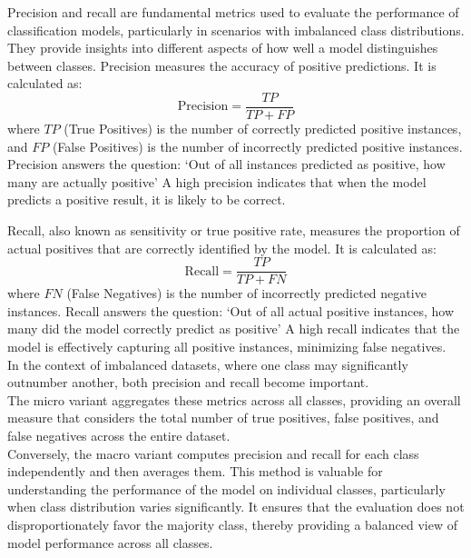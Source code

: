 Precision and recall are fundamental metrics used to evaluate the performance of classification models,
particularly in scenarios with imbalanced class distributions.
They provide insights into different aspects of how well a model distinguishes between classes.
Precision measures the accuracy of positive predictions. It is calculated as:
\[
    \text{Precision} = \frac{TP}{TP + FP}
\]
where \( TP \) (True Positives) is the number of correctly predicted positive instances,
and \( FP \) (False Positives) is the number of incorrectly predicted positive instances.
Precision answers the question: `Out of all instances predicted as positive, how many are actually positive'
A high precision indicates that when the model predicts a positive result, it is likely to be correct.

Recall, also known as sensitivity or true positive rate, measures the proportion of actual positives that are correctly identified by the model.
It is calculated as:
\[
    \text{Recall} = \frac{TP}{TP + FN}
\]
where \( FN \) (False Negatives) is the number of incorrectly predicted negative instances.
Recall answers the question: `Out of all actual positive instances, how many did the model correctly predict as positive'
A high recall indicates that the model is effectively capturing all positive instances, minimizing false negatives.\\
In the context of imbalanced datasets, where one class may significantly outnumber another, both precision and recall become important.\\
The micro variant aggregates these metrics across all classes, providing an overall measure that considers the total number of true positives,
false positives, and false negatives across the entire dataset.\\
Conversely, the macro variant computes precision and recall for each class independently and then averages them.
This method is valuable for understanding the performance of the model on individual classes, particularly when class distribution varies significantly.
It ensures that the evaluation does not disproportionately favor the majority class, thereby providing a balanced view of model performance across all classes.\\

